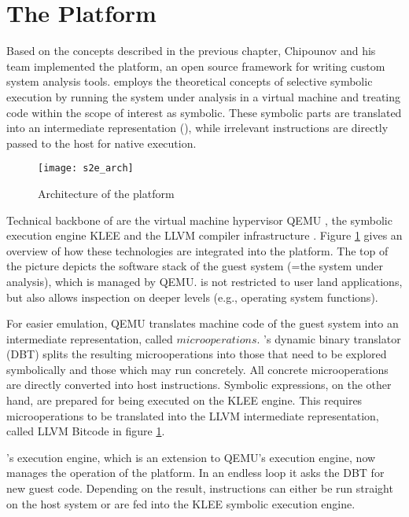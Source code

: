 \section{The \sse Platform}\label{sec:platform}

Based on the concepts described in the previous chapter, Chipounov and his team implemented the \sse platform, an open source framework for writing custom system analysis tools.
\sse employs the theoretical concepts of selective symbolic execution by running the system under analysis in a virtual machine and treating code within the scope of interest as symbolic.
These symbolic parts are translated into an intermediate representation (), while irrelevant instructions are directly passed to the host for native execution.


\begin{figure}
\texttt{[image: s2e\_arch]}
\caption{Architecture of the \sse platform \cite{chip12s2e}}
\label{fig:arch}
\end{figure}


Technical backbone of \sse are the virtual machine hypervisor QEMU \cite{qemu, qemu05}, the symbolic execution engine KLEE \cite{klee, klee08} and the LLVM compiler infrastructure \cite{llvm, llvm04}.
Figure \ref{fig:arch} gives an overview of how these technologies are integrated into the \sse platform.
The top of the picture depicts the software stack of the guest system (=the system under analysis), which is managed by QEMU.
\sse is not restricted to user land applications, but also allows inspection on deeper levels (e.g., operating system functions).

For easier emulation, QEMU translates machine code of the guest system into an intermediate representation, called $microoperations$.
\sse's dynamic binary translator (DBT) splits the resulting microoperations into those that need to be explored symbolically and those which may run concretely.
All concrete microoperations are directly converted into host instructions.
Symbolic expressions, on the other hand, are prepared for being executed on the KLEE engine.
This requires microoperations to be translated into the LLVM intermediate representation, called LLVM Bitcode in figure \ref{fig:arch}.

\sse's execution engine, which is an extension to QEMU's execution engine, now manages the operation of the platform.
In an endless loop it asks the DBT for new guest code.
Depending on the result, instructions can either be run straight on the host system or are fed into the KLEE symbolic execution engine.

